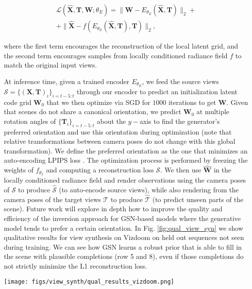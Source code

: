\documentclass[10pt,twocolumn,letterpaper]{article}
\begin{document}
\begin{eqnarray}
	\mathcal{L}(\hat{\textbf{X}}, \textbf{T}, \textbf{W}; \theta_E) =\|\textbf{W} - E_{\theta_E}(\hat{\textbf{X}}, \textbf{T}) \|_2 + \\
	+ \|\hat{\textbf{X}} - f(E_{\theta_E}(\hat{\textbf{X}}, \textbf{T}), \textbf{T}) \|_2,
\end{eqnarray}

where the first term encourages the reconstruction of the local latent grid, and the second term encourages samples from locally conditioned radiance field $f$ to match the original input views.

At inference time, given a trained encoder $E_{\theta_E}$, we feed the source views $\mathcal{S}=\{(\textbf{X}, \textbf{T})_i\}_{i=t-5:t}$ through our encoder to predict an initialization latent code grid $\textbf{W}_0$ that we then optimize via SGD for $1000$ iterations to get $\hat{\textbf{W}}$. Given that scenes do not share a canonical orientation, we predict $\textbf{W}_0$ at multiple rotation angles of $\{\textbf{T}_i\}_{i=t-5:t}$ about the $y-$axis to find the generator's preferred orientation and use this orientation during optimization (note that relative transformations between camera poses do not change with this global transformation). We define the preferred orientation as the one that minimizes an auto-encoding LPIPS loss \cite{lpips}. The optimization process is performed by freezing the weights of $f_{\theta_f}$ and computing a reconstruction loss \wrt $\mathcal{S}$. We then use $\hat{\textbf{W}}$ in the locally conditioned radiance field and render observations using the camera poses of $\mathcal{S}$ to produce $\hat{\mathcal{S}}$ (\ie to auto-encode source views), while also rendering from the camera poses of the target views $\mathcal{T}$ to produce $\hat{\mathcal{T}}$ (\ie to predict unseen parts of the scene). Future work will explore in depth how to improve the quality and efficiency of the inversion approach for GSN-based models where the generative model tends to prefer a certain orientation. In Fig. \ref{fig:qual_view_syn} we show qualitative results for view synthesis on Vizdoom on held out sequences not seen during training. We can see how GSN learns a robust prior that is able to fill in the scene with plausible completions (\eg row 5 and 8), even if those completions do not strictly minimize the L1 reconstruction loss. 

\begin{figure*}[h]
	\centering
	\texttt{[image: figs/view\_synth/qual\_results\_vizdoom.png]}
	\caption{Qualitative view synthesis results on Vizdoom sequences not seen during training. Given source views $\mathcal{S}$ we invert GSN to obtain a local latent code grid $\hat{\textbf{W}}$, which is then use both to reconstruct $\mathcal{S}$, denoted as $\hat{\mathcal{S}}$, and also to predict target views $\mathcal{T}$ (given their camera poses) which are denoted as $\hat{\mathcal{T}}$. Each row corresponds to a different set of source views $\mathcal{S}$. Frames highlighted in green are input to GSN, frames highlighted in blue are predictions.}
	\label{fig:qual_view_syn}
\end{figure*}
\end{document}
